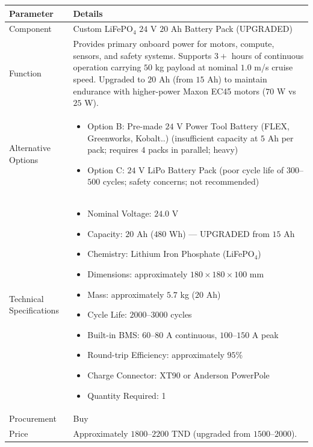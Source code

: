 \documentclass[12pt,a4paper]{article}
\begin{document}
\begin{longtable}{|p{4cm}|p{10cm}|}
\hline
\textbf{Parameter} & \textbf{Details} \\
\hline

Component &
Custom LiFePO$_4$ $24$ V $20$ Ah Battery Pack (UPGRADED) \\
\hline

Function &
Provides primary onboard power for motors, compute, sensors, and safety systems. Supports $3+$ hours of continuous operation carrying $50$ kg payload at nominal $1.0$ m/s cruise speed. Upgraded to $20$ Ah (from $15$ Ah) to maintain endurance with higher-power Maxon EC45 motors ($70$ W vs $25$ W). \\
\hline

Alternative Options &
\begin{itemize}
\item Option B: Pre-made $24$ V Power Tool Battery (FLEX, Greenworks, Kobalt..) (insufficient capacity at $5$ Ah per pack; requires $4$ packs in parallel; heavy)
\item Option C: $24$ V LiPo Battery Pack (poor cycle life of $300$--$500$ cycles; safety concerns; not recommended)
\end{itemize}
\\
\hline

Technical Specifications &
\begin{itemize}
\item Nominal Voltage: $24.0$ V
\item Capacity: $20$ Ah ($480$ Wh) — UPGRADED from $15$ Ah
\item Chemistry: Lithium Iron Phosphate (LiFePO$_4$)
\item Dimensions: approximately $180 \times 180 \times 100$ mm
\item Mass: approximately $5.7$ kg ($20$ Ah)
\item Cycle Life: $2000$--$3000$ cycles
\item Built-in BMS: $60$--$80$ A continuous, $100$--$150$ A peak
\item Round-trip Efficiency: approximately $95\%$
\item Charge Connector: XT90 or Anderson PowerPole
\item Quantity Required: 1
\end{itemize}
\\
\hline

Procurement &
Buy \\
\hline

Price &
Approximately $1800$--$2200$ TND (upgraded from $1500$--$2000$). \\
\hline


\end{longtable}
\end{document}
